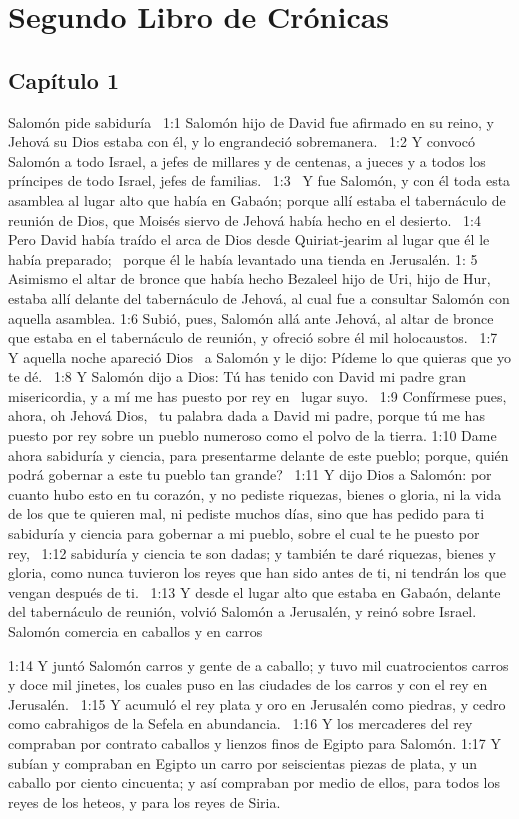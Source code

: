 \chapter{Segundo Libro de Crónicas}
\section*{Capítulo 1}
	Salomón pide sabiduría  
	1:1 Salomón hijo de David fue afirmado en su reino, y Jehová su Dios estaba con él, y lo engrandeció sobremanera.  
	1:2 Y convocó Salomón a todo Israel, a jefes de millares y de centenas, a jueces y a todos los príncipes de todo Israel, jefes de familias.  
	1:3  Y fue Salomón, y con él toda esta asamblea al lugar alto que había en Gabaón; porque allí estaba el tabernáculo de reunión de Dios, que Moisés siervo de Jehová había hecho en el desierto.  
	1:4 Pero David había traído el arca de Dios desde Quiriat-jearim al lugar que él le había preparado;  porque él le había levantado una tienda en Jerusalén. 
	1: 5 Asimismo el altar de bronce que había hecho Bezaleel hijo de Uri, hijo de Hur, estaba allí delante del tabernáculo de Jehová, al cual fue a consultar Salomón con aquella asamblea. 
	1:6 Subió, pues, Salomón allá ante Jehová, al altar de bronce que estaba en el tabernáculo de reunión, y ofreció sobre él mil holocaustos.  
	1:7 Y aquella noche apareció Dios  a Salomón y le dijo: Pídeme lo que quieras que yo te dé.  
	1:8 Y Salomón dijo a Dios: Tú has tenido con David mi padre gran misericordia, y a mí me has puesto por rey en  lugar suyo.  
	1:9 Confírmese pues, ahora, oh Jehová Dios,  tu palabra dada a David mi padre, porque tú me has puesto por rey sobre un pueblo numeroso como el polvo de la tierra. 
	1:10 Dame ahora sabiduría y ciencia, para presentarme delante de este pueblo; porque, quién podrá gobernar a este tu pueblo tan grande?  
	1:11 Y dijo Dios a Salomón: por cuanto hubo esto en tu corazón, y no pediste riquezas, bienes o gloria, ni la vida de los que te quieren mal, ni pediste muchos días, sino que has pedido para ti sabiduría y ciencia para gobernar a mi pueblo, sobre el cual te he puesto por rey,  
	1:12 sabiduría y ciencia te son dadas; y también te daré riquezas, bienes y gloria, como nunca tuvieron los reyes que han sido antes de ti, ni tendrán los que vengan después de ti.  
	1:13 Y desde el lugar alto que estaba en Gabaón, delante del tabernáculo de reunión, volvió Salomón a Jerusalén, y reinó sobre Israel.  
	Salomón comercia en caballos y en carros  
	
	1:14 Y juntó Salomón carros y gente de a caballo; y tuvo mil cuatrocientos carros y doce mil jinetes, los cuales puso en las ciudades de los carros y con el rey en Jerusalén.  
	1:15 Y acumuló el rey plata y oro en Jerusalén como piedras, y cedro como cabrahigos de la Sefela en abundancia.  
	1:16 Y los mercaderes del rey compraban por contrato caballos y lienzos finos de Egipto para Salomón. 
	1:17 Y subían y compraban en Egipto un carro por seiscientas piezas de plata, y un caballo por ciento cincuenta; y así compraban por medio de ellos, para todos los reyes de los heteos, y para los reyes de Siria.  
